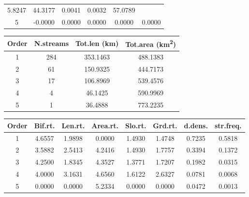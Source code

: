 \documentclass[11pt,]{article}
\begin{document}
\begin{longtable}[]{@{}cccccc@{}}
\begin{minipage}[t]{0.11\columnwidth}
5.8247\strut
\end{minipage} & \begin{minipage}[t]{0.26\columnwidth}\centering\strut
44.3177\strut
\end{minipage} & \begin{minipage}[t]{0.11\columnwidth}\centering\strut
0.0041\strut
\end{minipage} & \begin{minipage}[t]{0.14\columnwidth}\centering\strut
0.0032\strut
\end{minipage} & \begin{minipage}[t]{0.13\columnwidth}\centering\strut
57.0789\strut
\end{minipage}\tabularnewline
\begin{minipage}[t]{0.08\columnwidth}\centering\strut
5\strut
\end{minipage} & \begin{minipage}[t]{0.11\columnwidth}\centering\strut
-0.0000\strut
\end{minipage} & \begin{minipage}[t]{0.26\columnwidth}\centering\strut
0.0000\strut
\end{minipage} & \begin{minipage}[t]{0.11\columnwidth}\centering\strut
0.0000\strut
\end{minipage} & \begin{minipage}[t]{0.14\columnwidth}\centering\strut
0.0000\strut
\end{minipage} & \begin{minipage}[t]{0.13\columnwidth}\centering\strut
0.0000\strut
\end{minipage}\tabularnewline
\bottomrule
\end{longtable}

\begin{longtable}[]{@{}cccc@{}}
\toprule
Order & N.streams & Tot.len (km) & Tot.area
(km\textsuperscript{2})\tabularnewline
\midrule
\endhead
1 & 284 & 353.1463 & 488.1383\tabularnewline
2 & 61 & 150.9325 & 444.7173\tabularnewline
3 & 17 & 106.8969 & 539.4576\tabularnewline
4 & 4 & 46.1425 & 590.9969\tabularnewline
5 & 1 & 36.4888 & 773.2235\tabularnewline
\bottomrule
\end{longtable}

\begin{longtable}[]{@{}cccccccc@{}}
\toprule
Order & Bif.rt. & Len.rt. & Area.rt. & Slo.rt. & Grd.rt. & d.dens. &
str.freq.\tabularnewline
\midrule
\endhead
1 & 4.6557 & 1.9898 & 0.0000 & 1.4930 & 1.4748 & 0.7235 &
0.5818\tabularnewline
2 & 3.5882 & 2.5413 & 4.2416 & 1.4930 & 1.7757 & 0.3394 &
0.1372\tabularnewline
3 & 4.2500 & 1.8345 & 4.3527 & 1.3771 & 1.7207 & 0.1982 &
0.0315\tabularnewline
4 & 4.0000 & 3.1631 & 4.6560 & 1.6122 & 2.6327 & 0.0781 &
0.0068\tabularnewline
5 & 0.0000 & 0.0000 & 5.2334 & 0.0000 & 0.0000 & 0.0472 &
0.0013\tabularnewline
\bottomrule
\end{longtable}
\end{document}
